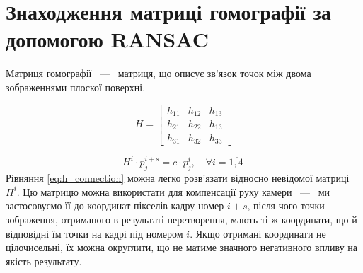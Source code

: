\section{Знаходження матриці гомографії за допомогою RANSAC}

Матриця гомографії ~---~ матриця, що описує зв'язок точок між двома зображеннями плоскої поверхні.

\begin{equation}
    H =
    \begin{bmatrix}
        h_{11} & h_{12} & h_{13} \\
        h_{21} & h_{22} & h_{13} \\
        h_{31} & h_{32} & h_{33}
    \end{bmatrix}
    \label{eq:h_matrix}
\end{equation}

\begin{equation}
    H^{i} \cdot p_{j}^{i + s} = c \cdot p_{j}^{i},\quad\forall i = \overline{1,4\ }
    \label{eq:h_connection}
\end{equation}
Рівняння \ref{eq:h_connection} можна легко розв'язати відносно невідомої матриці
\(H^{i}\). Цю матрицю можна використати для компенсації руху камери
~---~ ми застосовуємо її до координат пікселів кадру номер \(i + s\), після
чого точки зображення, отриманого в результаті перетворення, мають ті ж
координати, що й відповідні їм точки на кадрі під номером \(i\). Якщо
отримані координати не цілочисельні, їх можна округлити, що не матиме
значного негативного впливу на якість результату.

